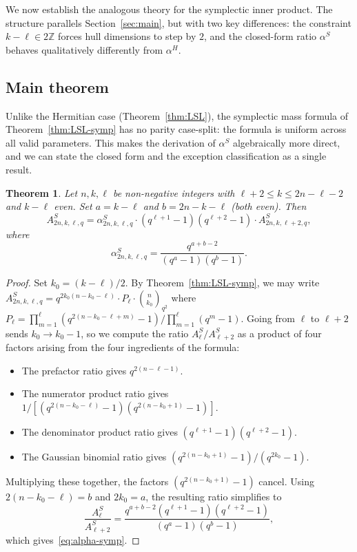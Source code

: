 \documentclass[10pt,a4paper]{amsart}
\newtheorem{theorem}{Theorem}
\begin{document}
We now establish the analogous theory for the symplectic inner product.
The structure parallels Section~\ref{sec:main}, but with two key differences:
the constraint $k - \ell \in 2\mathbb{Z}$ forces hull dimensions to step by $2$, and
the closed-form ratio $\alpha^S$ behaves qualitatively differently from $\alpha^H$.

\subsection{Main theorem}\label{sec:Smain}

Unlike the Hermitian case (Theorem~\ref{thm:LSL}), the symplectic mass formula
of Theorem~\ref{thm:LSL-symp} has no parity case-split: the formula is uniform
across all valid parameters. This makes the derivation of $\alpha^S$
algebraically more direct, and we can state the closed form and the
exception classification as a single result.

\begin{theorem}\label{thm:main-symp}
Let $n, k, \ell$ be non-negative integers with $\ell + 2 \leq k \leq 2n - \ell - 2$
and $k - \ell$ even. Set $a = k - \ell$ and $b = 2n - k - \ell$ (both even). Then
\[
  A^S_{2n,k,\ell,q} = \alpha^S_{2n,k,\ell,q} \cdot (q^{\ell+1}-1)(q^{\ell+2}-1) \cdot A^S_{2n,k,\ell+2,q},
\]
where
\begin{equation}\label{eq:alpha-symp}
  \alpha^S_{2n,k,\ell,q} = \frac{q^{a+b-2}}{(q^{a}-1)(q^{b}-1)}.
\end{equation}
\end{theorem}

\begin{proof}
Set $k_0 = (k-\ell)/2$. By Theorem~\ref{thm:LSL-symp}, we may write
$A^S_{2n, k, \ell, q} = q^{2k_0(n-k_0-\ell)} \cdot P_\ell \cdot \binom{n}{k_0}_{q^2}$
where $P_\ell = \prod_{m=1}^{\ell}(q^{2(n-k_0-\ell+m)}-1) / \prod_{m=1}^{\ell}(q^m-1)$.
Going from $\ell$ to $\ell+2$ sends $k_0 \to k_0 - 1$, so we compute the ratio
$A^S_\ell / A^S_{\ell+2}$ as a product of four factors arising from the four
ingredients of the formula:
\begin{itemize}
\item The prefactor ratio gives $q^{2(n-\ell-1)}$.
\item The numerator product ratio gives $1 / [(q^{2(n-k_0-\ell)}-1)(q^{2(n-k_0+1)}-1)]$.
\item The denominator product ratio gives $(q^{\ell+1}-1)(q^{\ell+2}-1)$.
\item The Gaussian binomial ratio gives $(q^{2(n-k_0+1)}-1) / (q^{2k_0}-1)$.
\end{itemize}
Multiplying these together, the factors $(q^{2(n-k_0+1)}-1)$ cancel. Using
$2(n-k_0-\ell) = b$ and $2k_0 = a$, the resulting ratio simplifies to
\[
  \frac{A^S_\ell}{A^S_{\ell+2}} = \frac{q^{a+b-2} (q^{\ell+1}-1)(q^{\ell+2}-1)}{(q^a-1)(q^b-1)},
\]
which gives~\eqref{eq:alpha-symp}.
\end{proof}
\end{document}
